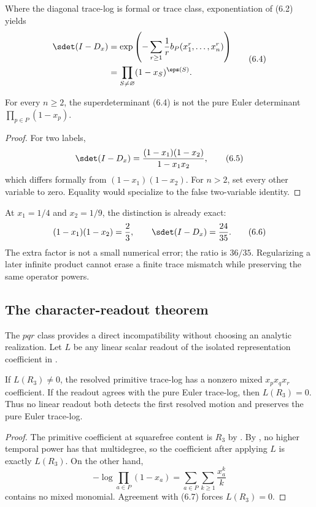 Where the diagonal trace-log is formal or trace class, exponentiation of
(6.2) yields
\[
\begin{split}
 \sdet(I-D_x)
 &=\exp\left(-\sum_{r\ge1}\frac1r
       b_P(x_1^r,\ldots,x_n^r)\right)\\
 &=\prod_{S\ne\varnothing}(1-x_S)^{\eps(S)}.
\end{split}
\tag{6.4}
\]

\begin{theorem}
\label{thm:diagonal-determinant}
For every $n\ge2$, the superdeterminant (6.4) is not the pure Euler
determinant $\prod_{p\in P}(1-x_p)$.
\end{theorem}

\begin{proof}
For two labels,
\[
  \sdet(I-D_x)
  =\frac{(1-x_1)(1-x_2)}{1-x_1x_2},
  \tag{6.5}
\]
which differs formally from $(1-x_1)(1-x_2)$.  For $n>2$, set every other
variable to zero.  Equality would specialize to the false two-variable
identity.
\end{proof}

At $x_1=1/4$ and $x_2=1/9$, the distinction is already exact:
\[
  (1-x_1)(1-x_2)=\frac23,
  \qquad
  \sdet(I-D_x)=\frac{24}{35}.
  \tag{6.6}
\]
The extra factor is not a small numerical error; the ratio is $36/35$.
Regularizing a later infinite product cannot erase a finite trace mismatch
while preserving the same operator powers.

\subsection{The character-readout theorem}

The $pqr$ class provides a direct incompatibility without choosing an
analytic realization.  Let $L$ be any linear scalar readout of the isolated
representation coefficient in .

\begin{theorem}
\label{thm:readout}
If $L(R_3)\ne0$, the resolved primitive trace-log has a nonzero mixed
$x_px_qx_r$ coefficient.  If the readout agrees with the pure Euler
trace-log, then $L(R_3)=0$.  Thus no linear readout both detects the first
resolved motion and preserves the pure Euler trace-log.
\end{theorem}

\begin{proof}
The primitive coefficient at squarefree content is $R_3$ by
.  By , no higher temporal power has
that multidegree, so the coefficient after applying $L$ is exactly $L(R_3)$.
On the other hand,
\[
  -\log\prod_{a\in P}(1-x_a)
  =\sum_{a\in P}\sum_{k\ge1}\frac{x_a^k}{k}
  \tag{6.7}
\]
contains no mixed monomial.  Agreement with (6.7) forces $L(R_3)=0$.
\end{proof}

